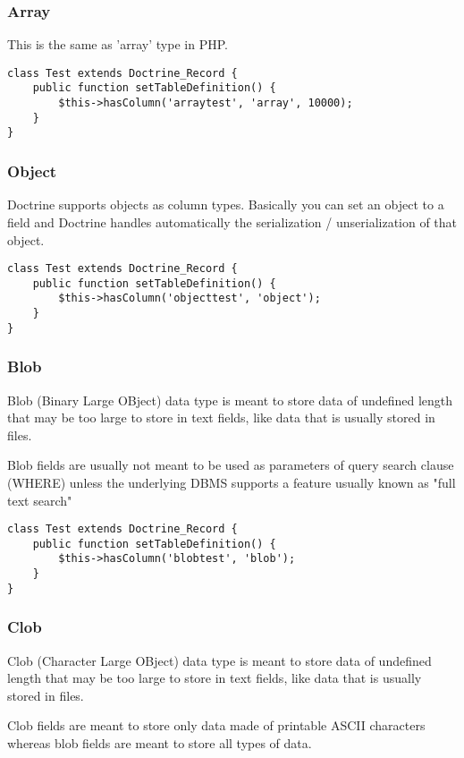 \documentclass[11pt,a4paper]{report}
\begin{document}
\subsubsection{Array}
This is the same as 'array' type in PHP.

\begin{verbatim}
class Test extends Doctrine_Record {
    public function setTableDefinition() {
        $this->hasColumn('arraytest', 'array', 10000);
    }
}
\end{verbatim}

\subsubsection{Object}
Doctrine supports objects as column types. Basically you can set an object to a field and Doctrine handles automatically the serialization / unserialization of that object.

\begin{verbatim}
class Test extends Doctrine_Record {
    public function setTableDefinition() {
        $this->hasColumn('objecttest', 'object');
    }
}
\end{verbatim}

\subsubsection{Blob}
Blob (Binary Large OBject) data type is meant to store data of undefined length that may be too large to store in text fields, like data that is usually stored in files.

Blob fields are usually not meant to be used as parameters of query search clause (WHERE) unless the underlying DBMS supports a feature usually known as "full text search"

\begin{verbatim}
class Test extends Doctrine_Record {
    public function setTableDefinition() {
        $this->hasColumn('blobtest', 'blob');
    }
}
\end{verbatim}

\subsubsection{Clob}
Clob (Character Large OBject) data type is meant to store data of undefined length that may be too large to store in text fields, like data that is usually stored in files.

Clob fields are meant to store only data made of printable ASCII characters whereas blob fields are meant to store all types of data.
\end{document}
